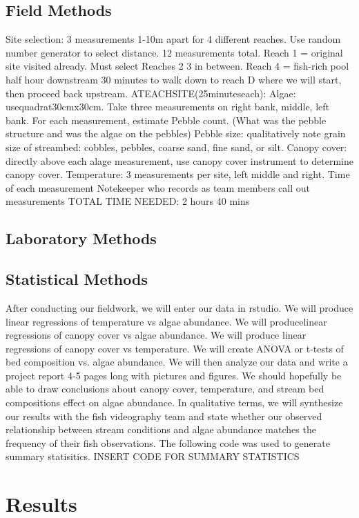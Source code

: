 \documentclass{article}
\begin{document}
\subsection{Field Methods}
Site selection: 3 measurements 1-10m apart for 4 diﬀerent reaches. Use random number generator to select distance. 12 measurements total. Reach 1 = original site visited already. Must select Reaches 2 3 in between. Reach 4 = ﬁsh-rich pool half hour downstream 30 minutes to walk down to reach D where we will start, then proceed back upstream. ATEACHSITE(25minuteseach): Algae: usequadrat30cmx30cm. Take three measurements on right bank, middle, left bank. For each measurement, estimate Pebble count. (What was the pebble structure and was the algae on the pebbles) Pebble size: qualitatively note grain size of streambed: cobbles, pebbles, coarse sand, ﬁne sand, or silt. Canopy cover: directly above each alage measurement, use canopy cover instrument to determine canopy cover. Temperature: 3 measurements per site, left middle and right. Time of each measurement Notekeeper who records as team members call out measurements TOTAL TIME NEEDED: 2 hours 40 mins
\subsection{Laboratory Methods}

\subsection{Statistical Methods}
After conducting our ﬁeldwork, we will enter our data in rstudio. We will produce linear regressions of temperature vs algae abundance. We will producelinear regressions of canopy cover vs algae abundance. We will produce linear regressions of canopy cover vs temperature. We will create ANOVA or t-tests of bed composition vs. algae abundance. We will then analyze our data and write a project report 4-5 pages long with pictures and ﬁgures. We should hopefully be able to draw conclusions about canopy cover, temperature, and stream bed compositions eﬀect on algae abundance. In qualitative terms, we will synthesize our results with the ﬁsh videography team and state whether our observed relationship between stream conditions and algae abundance matches the frequency of their ﬁsh observations.
The following code was used to generate summary statisitics. 
INSERT CODE FOR SUMMARY STATISTICS

\section{Results}
\end{document}
